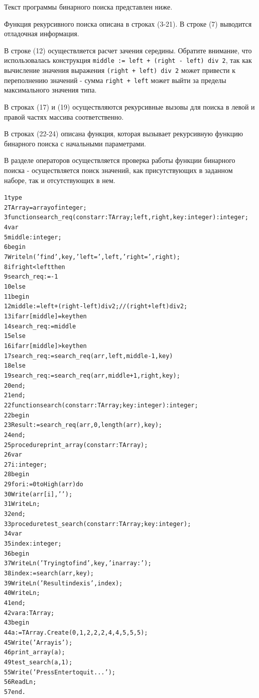 \documentclass[12pt,a4paper]{article}
\begin{document}
Текст программы бинарного поиска представлен ниже.

Функция рекурсивного поиска описана в строках (3-21). В строке (7) выводится отладочная информация. 

В строке (12) осуществляется расчет зачения середины. Обратите внимание, что использовалась конструкция \texttt{middle := left + (right - left) div 2}, так как вычисление значения выражения \texttt{(right + left) div 2} может привести к переполнению значений - сумма \texttt{right + left} может выйти за пределы максимального значения типа.

В строках (17) и (19) осуществляются рекурсивные вызовы для поиска в левой и правой частях массива соответственно.

В строках (22-24) описана функция, которая вызывает рекурсивную функцию бинарного поиска с начальными параметрами.

В разделе операторов осуществляется проверка работы функции бинарного поиска - осуществляется поиск значений, как присутствующих в заданном наборе, так и отсутствующих в нем.

\begin{alltt}
1	type
2	  TArray = array of integer;	
3	function search\_req(const arr: TArray; left, right, key: integer): integer;
4	var
5	  middle: integer;
6	begin
7	  Writeln('find ', key, ' left = ', left, ' right = ', right);	
8	  if right < left then
9	    search\_req := -1
10	  else
11	    begin
12	      middle := left + (right - left) div 2; //(right + left) div 2;	
13	      if arr[middle] = key then
14	        search\_req := middle
15	      else
16	        if arr[middle] > key then
17	          search\_req := search\_req(arr, left, middle-1, key)
18	        else
19	          search\_req := search\_req(arr, middle+1, right, key);
20	    end;
21    end;	
22	function search(const arr: TArray; key: integer): integer;
22	begin
23	  Result := search\_req(arr, 0, length(arr), key);
24	end;	
25	procedure print\_array(const arr: TArray);
26	var
27	  i: integer;
28	begin
29	  for i := 0 to High(arr) do
30	    Write(arr[i], ' ');
31	  WriteLn;
32	end;
33	procedure test\_search(const arr: TArray; key: integer);
34	var
35 	  index: integer;
36	begin
37	  WriteLn('Trying to find ', key, ' in array: ');	
38	  index := search(arr, key);	
39	  WriteLn('Result index is ', index);
40	  WriteLn;
41	end;
42	var	a: TArray;	
43	begin
44	  a := TArray.Create(0, 1, 2, 2, 2, 4, 4, 5, 5, 5);	
45	  Write('Array is ');
46	  print\_array(a);	
49	  test\_search(a, 1);
55	  Write('Press Enter to quit...');
56	  ReadLn;
57	end.
\end{alltt}
\end{document}

